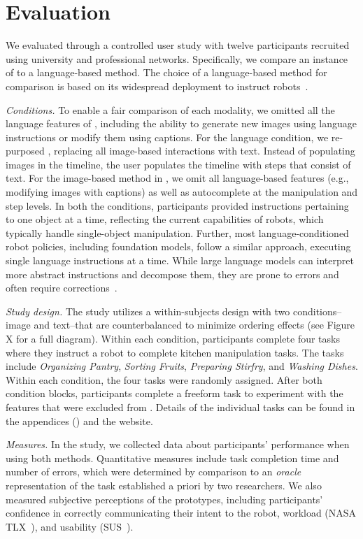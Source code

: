 \section{Evaluation}
We evaluated \projname through a controlled user study with twelve participants recruited using university and professional networks. Specifically, we compare an instance of \projname to a language-based method. The choice of a language-based method for comparison is based on its widespread deployment to instruct robots~\cite{team2024octo, zha2023distilling}.

\emph{Conditions.} To enable a fair comparison of each modality, we omitted all the language features of \projname, including the ability to generate new images using language instructions or modify them using captions. For the language condition, we re-purposed \projname, replacing all image-based interactions with text. Instead of populating images in the timeline, the user populates the timeline with steps that consist of text. For the image-based method in \projname, we omit all language-based features (e.g., modifying images with captions) as well as autocomplete at the manipulation and step levels. In both the conditions, participants provided instructions pertaining to one object at a time, reflecting the current capabilities of robots, which typically handle single-object manipulation. Further, most language-conditioned robot policies, including foundation models, follow a similar approach, executing single language instructions at a time. While large language models can interpret more abstract instructions and decompose them, they are prone to errors and often require corrections~\cite{zha2023distilling}.

\emph{Study design.} The study utilizes a within-subjects design with two conditions--image and text--that are counterbalanced to minimize ordering effects (see Figure X for a full diagram). Within each condition, participants complete four tasks where they instruct a robot to complete kitchen manipulation tasks. The tasks include \textit{Organizing Pantry}, \textit{Sorting Fruits}, \textit{Preparing Stirfry}, and \textit{Washing Dishes}. Within each condition, the four tasks were randomly assigned. After both condition blocks, participants complete a freeform task to experiment with the features that were excluded from \projname. Details of the individual tasks can be found in the appendices () and the website.

\emph{Measures.} In the study, we collected data about participants' performance when using both methods. Quantitative measures include task completion time and number of errors, which were determined by comparison to an \textit{oracle} representation of the task established a priori by two researchers. We also measured subjective perceptions of the prototypes, including participants' confidence in correctly communicating their intent to the robot, workload (NASA TLX~\cite{hart2006nasa}), and usability (SUS~\cite{bangor2008empirical}).

